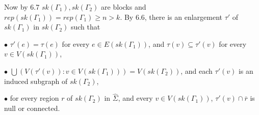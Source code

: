 Now by 6.7 $sk(\Gamma_1), sk(\Gamma_2)$ are blocks and $rep(sk(\Gamma_1)) = rep(\Gamma_1)\ge n>k$. By 6.6, there is an enlargement $\tau'$ of $sk(\Gamma_1)$ in $sk(\Gamma_2)$ such that

\hspace*{12pt}$\bullet$ $\tau'(e) = \tau(e)$ for every $e\in E(sk(\Gamma_1))$, and $\tau(v)\subseteq \tau'(v)$ for every $v\in V(sk(\Gamma_1))$,

\hspace*{12pt}$\bullet$ $\bigcup(V(\tau'(v)) : v\in V(sk(\Gamma_1))) = V(sk(\Gamma_2))$, and each $\tau'(v)$ is an induced subgraph of $sk(\Gamma_2)$,

\hspace*{12pt}$\bullet$ for every region $r$ of $sk(\Gamma_2)$ in $\hat{\Sigma}$, and every $v\in V(sk(\Gamma_1))$, $\tau'(v)\cap \bar{r}$ is null or connected.

